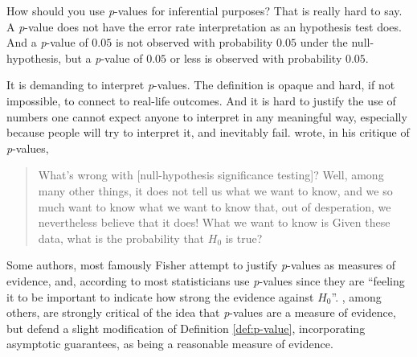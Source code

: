 How should you use \emph{p}-values for inferential purposes? That is really hard to say. A \emph{p}-value does not have the error rate interpretation as an hypothesis test does. And a \textit{p}-value of $0.05$ is not observed with probability $0.05$ under the null-hypothesis, but a \emph{p}-value of $0.05$ or less is observed with probability $0.05$. 

It is demanding to interpret \emph{p}-values. The definition is opaque and hard, if not impossible, to connect to real-life outcomes. And it is hard to justify the use of numbers one cannot expect anyone to interpret in any meaningful way, especially because people will try to interpret it, and inevitably fail. \textcite{Cohen1994-au} wrote, in his critique of \emph{p}-values, 
\begin{quotation}
What's wrong with {[}null-hypothesis significance testing{]}? Well, among many other things, it does not tell us what we want to know, and we so much want to know what we want to know that, out of desperation, we nevertheless believe that it does! What we want to know is \textquotedbl Given these data, what is the probability that $H_{0}$ is true?\textquotedbl{}
\end{quotation}
Some authors, most famously Fisher \parencite{Liu2020-er} attempt to justify \emph{p}-values
as measures of evidence, and, according to \textcite{Berger1987-tf}
most statisticians use \emph{p}-values since they are ``feeling it
to be important to indicate how strong the evidence against $H_{0}$''.
\textcite{Hubbard2008-cg}, among others, are strongly critical of the idea that \emph{p}-values are a measure of evidence, but \textcite{Liu2020-er} defend a slight modification of Definition \ref{def:p-value}, incorporating asymptotic guarantees, as being a reasonable measure of evidence.

